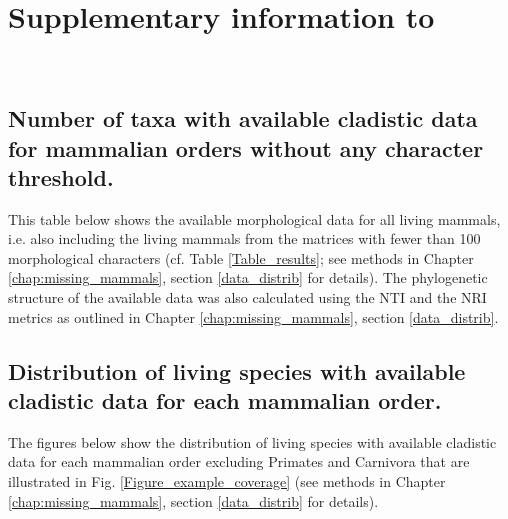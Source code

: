 %
%

\chapter{Supplementary information to }

\label{chap:Appendix_missing_mammals}

\bigskip
\medskip
\begin{center}

 \\
\bigskip
\end{center}

\section{Number of taxa with available cladistic data for mammalian orders without any character threshold.}
This table below shows the available morphological data for all living mammals, i.e. also including the living mammals from the matrices with fewer than 100 morphological characters (cf. Table \ref{Table_results}; see methods in Chapter \ref{chap:missing_mammals}, section \ref{data_distrib} for details).
The phylogenetic structure of the available data was also calculated using the NTI and the NRI metrics as outlined in Chapter \ref{chap:missing_mammals}, section \ref{data_distrib}.



\section{Distribution of living species with available cladistic data for each mammalian order.}

The figures below show the distribution of living species with available cladistic data for each mammalian order excluding Primates and Carnivora that are illustrated in Fig. \ref{Figure_example_coverage} (see methods in Chapter \ref{chap:missing_mammals}, section \ref{data_distrib} for details).

